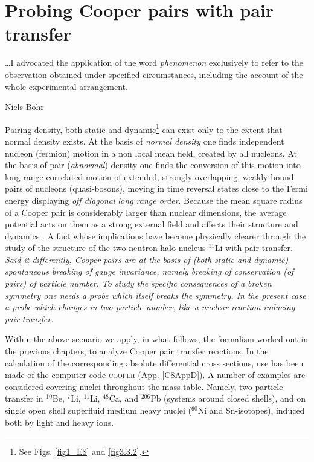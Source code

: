  \chapter{Probing Cooper pairs with pair transfer}\label{C8}
  \epigraph{\dots I advocated the application of the word \textit{phenomenon} exclusively to refer to the observation obtained under specified circumstances, including the account of the whole experimental arrangement.}{Niels Bohr}
Pairing density, both static  and dynamic\footnote{See Figs. \ref{fig1_E8} and \ref{fig3.3.2}.}  can exist only to the extent that normal density exists. At the basis of \textit{normal density} one finds independent nucleon (fermion) motion in a non local mean field, created by all nucleons. At the basis of pair (\textit{abnormal}) density one finds the conversion of this motion into long range correlated motion of extended, strongly overlapping, weakly bound pairs  of nucleons (quasi-bosons), moving in time reversal states close to the Fermi energy displaying \textit{off diagonal long range order}. Because the mean square radius of a Cooper pair is considerably larger than nuclear dimensions, the average potential acts on them as a strong external field and affects their structure and dynamics 
. A fact whose implications have become physically clearer through the study of the structure of the two-neutron  halo nucleus $^{11}$Li with pair transfer. \textit{Said it differently, Cooper pairs are at the basis of (both static and dynamic) spontaneous breaking of gauge invariance, namely breaking of conservation (of pairs) of particle number. To study the specific consequences of a broken symmetry one needs a probe which itself breaks the symmetry. In the present case a probe which changes in two particle number, like a nuclear reaction inducing  pair transfer.}

Within the above scenario we apply, in   what follows, the formalism worked out in the previous chapters, to analyze Cooper pair transfer reactions. In the calculation of the corresponding absolute differential cross sections, use has been made of the computer code \textsc{cooper} (App. \ref{C8AppD}).
 A number of examples are considered covering nuclei throughout the mass table. Namely,   two-particle transfer  in $^{10}$Be,    $^{7}$Li, $^{11}$Li, $^{48}$Ca, and $^{206}$Pb (systems around closed shells), and on single open shell superfluid   medium heavy nuclei ($^{60}$Ni and Sn-isotopes), induced both by light and heavy ions.
